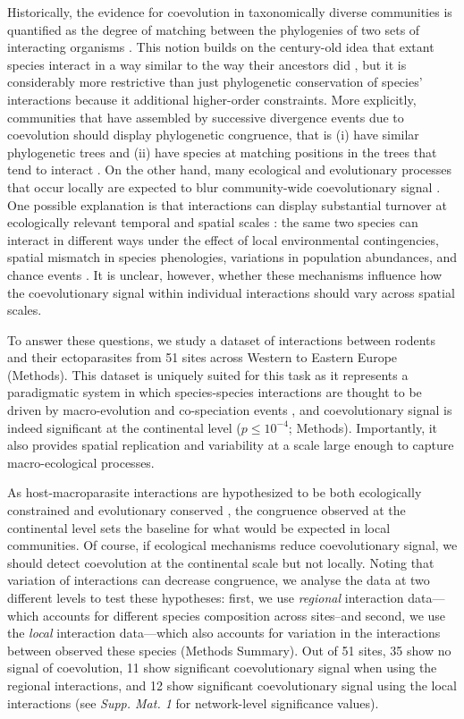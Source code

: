\documentclass{pnastwo}
\begin{document}
\begin{article}
Historically, the evidence for coevolution in taxonomically diverse
communities is quantified as the degree of matching between the
phylogenies of two sets of interacting organisms \cite{lege02}. This
notion builds on the century-old idea that extant species interact in a
way similar to the way their ancestors did \cite{fahr13}, but it is
considerably more restrictive than just phylogenetic conservation of
species' interactions \cite{reze07, eklo11} because it additional
higher-order constraints. More explicitly, communities that have
assembled by successive divergence events due to coevolution should
display phylogenetic congruence, that is (i) have similar phylogenetic
trees and (ii) have species at matching positions in the trees that tend
to interact \cite{page03}. On the other hand, many ecological and
evolutionary processes that occur locally are expected to blur
community-wide coevolutionary signal \cite{pois15}. One possible
explanation is that interactions can display substantial turnover at
ecologically relevant temporal and spatial scales \cite{pois12c}: the
same two species can interact in different ways under the effect of
local environmental contingencies, spatial mismatch in species
phenologies, variations in population abundances, and chance events
\cite{pois15a}. It is unclear, however, whether these mechanisms
influence how the coevolutionary signal within individual interactions
should vary across spatial scales.

To answer these questions, we study a dataset of interactions between
rodents and their ectoparasites from 51 sites across Western to Eastern
Europe \cite{kras12b} (Methods). This dataset is uniquely
suited for this task as it represents a paradigmatic system in which
species-species interactions are thought to be driven by macro-evolution
and co-speciation events \cite{vern09}, and coevolutionary signal is
indeed significant at the continental level \cite{kras12a}
(\(p \leq 10^{-4}\); Methods). Importantly, it also provides spatial
replication and variability at a scale large enough to capture
macro-ecological processes.

As host-macroparasite interactions are hypothesized to be both
ecologically constrained and evolutionary conserved \cite{comb01}, the
congruence observed at the continental level sets the baseline for what
would be expected in local communities. Of course, if ecological
mechanisms reduce coevolutionary signal, we should detect coevolution at
the continental scale but not locally. Noting that variation of
interactions can decrease congruence, we analyse the data at two
different levels to test these hypotheses: first, we use \emph{regional}
interaction data---which accounts for different species composition
across sites--and second, we use the \emph{local} interaction
data---which also accounts for variation in the interactions between
observed these species (Methods Summary). Out of 51 sites, 35 show no
signal of coevolution, 11 show significant coevolutionary signal when
using the regional interactions, and 12 show significant coevolutionary
signal using the local interactions (see \emph{Supp. Mat. 1} for
network-level significance values).


\end{article}
\end{document}
